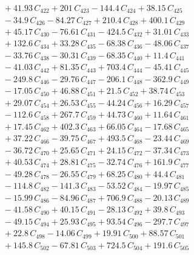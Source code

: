 \documentclass[a4paper,11pt]{article}
\begin{document}
\begin{align}
&\quad + 41.93\,C_{422} + 201\,C_{423} - 144.4\,C_{424} + 38.15\,C_{425} \nonumber\\
&\quad - 34.9\,C_{426} - 84.27\,C_{427} + 210.4\,C_{428} + 400.1\,C_{429} \nonumber\\
&\quad + 45.17\,C_{430} - 76.61\,C_{431} - 424.5\,C_{432} + 31.01\,C_{433} \nonumber\\
&\quad + 132.6\,C_{434} + 33.28\,C_{435} - 68.38\,C_{436} - 48.06\,C_{437} \nonumber\\
&\quad - 33.76\,C_{438} - 30.31\,C_{439} - 68.35\,C_{440} + 11.4\,C_{441} \nonumber\\
&\quad - 41.03\,C_{442} + 81.35\,C_{443} + 703.4\,C_{444} - 45.41\,C_{445} \nonumber\\
&\quad - 249.8\,C_{446} - 29.76\,C_{447} - 206.1\,C_{448} - 362.9\,C_{449} \nonumber\\
&\quad - 17.05\,C_{450} + 46.88\,C_{451} + 21.5\,C_{452} + 38.74\,C_{453} \nonumber\\
&\quad + 29.07\,C_{454} + 26.53\,C_{455} - 44.24\,C_{456} + 16.29\,C_{457} \nonumber\\
&\quad - 112.6\,C_{458} + 267.7\,C_{459} + 44.73\,C_{460} + 11.64\,C_{461} \nonumber\\
&\quad + 17.45\,C_{462} + 402.3\,C_{463} + 66.05\,C_{464} - 17.68\,C_{465} \nonumber\\
&\quad + 37.22\,C_{466} - 39.75\,C_{467} + 493.5\,C_{468} - 23.44\,C_{469} \nonumber\\
&\quad - 36.72\,C_{470} + 25.65\,C_{471} + 24.15\,C_{472} - 37.34\,C_{473} \nonumber\\
&\quad + 40.53\,C_{474} + 28.81\,C_{475} - 32.74\,C_{476} + 161.9\,C_{477} \nonumber\\
&\quad - 49.28\,C_{478} - 26.55\,C_{479} + 68.25\,C_{480} + 44.4\,C_{481} \nonumber\\
&\quad - 114.8\,C_{482} - 141.3\,C_{483} - 53.52\,C_{484} - 19.97\,C_{485} \nonumber\\
&\quad - 15.99\,C_{486} - 84.96\,C_{487} + 706.9\,C_{488} - 20.13\,C_{489} \nonumber\\
&\quad - 41.58\,C_{490} + 40.15\,C_{491} - 28.13\,C_{492} + 39.8\,C_{493} \nonumber\\
&\quad - 49.15\,C_{494} + 25.93\,C_{495} + 93.54\,C_{496} - 297.7\,C_{497} \nonumber\\
&\quad + 22.8\,C_{498} - 14.06\,C_{499} + 19.91\,C_{500} + 88.57\,C_{501} \nonumber\\
&\quad + 145.8\,C_{502} - 67.81\,C_{503} + 724.5\,C_{504} + 191.6\,C_{505} \nonumber\\

\end{align}
\end{document}
